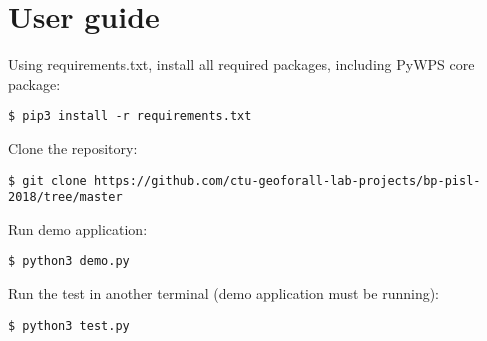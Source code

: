 \chapter{User guide}
\label{user-guide}


Using requirements.txt, install all required packages, including PyWPS core package: 
\begin{lstlisting}
$ pip3 install -r requirements.txt
\end{lstlisting}

Clone the repository:

\begin{lstlisting}
$ git clone https://github.com/ctu-geoforall-lab-projects/bp-pisl-2018/tree/master
\end{lstlisting}

Run demo application:

\begin{lstlisting}
$ python3 demo.py
\end{lstlisting}

Run the test in another terminal (demo application must be running):

\begin{lstlisting}
$ python3 test.py
\end{lstlisting}






%
%
%
%
%




